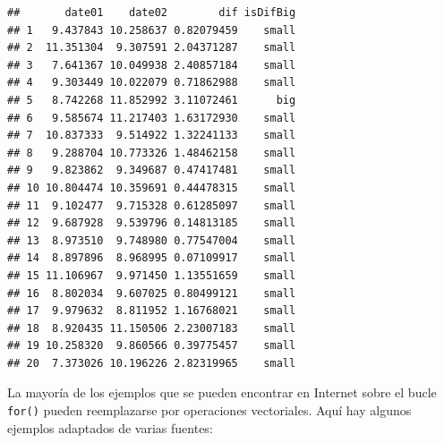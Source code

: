 \documentclass[
]{book}
\newenvironment{Shaded}{\begin{snugshade}}{\end{snugshade}}
\newcommand{\CommentTok}[1]{\textcolor[rgb]{0.56,0.35,0.01}{\textit{#1}}}
\newcommand{\ControlFlowTok}[1]{\textcolor[rgb]{0.13,0.29,0.53}{\textbf{#1}}}
\newcommand{\DataTypeTok}[1]{\textcolor[rgb]{0.13,0.29,0.53}{#1}}
\newcommand{\DecValTok}[1]{\textcolor[rgb]{0.00,0.00,0.81}{#1}}
\newcommand{\KeywordTok}[1]{\textcolor[rgb]{0.13,0.29,0.53}{\textbf{#1}}}
\newcommand{\NormalTok}[1]{#1}
\newcommand{\OperatorTok}[1]{\textcolor[rgb]{0.81,0.36,0.00}{\textbf{#1}}}
\newcommand{\StringTok}[1]{\textcolor[rgb]{0.31,0.60,0.02}{#1}}
\begin{document}
\begin{Shaded}
\end{Shaded}

\begin{verbatim}
##       date01    date02        dif isDifBig
## 1   9.437843 10.258637 0.82079459    small
## 2  11.351304  9.307591 2.04371287    small
## 3   7.641367 10.049938 2.40857184    small
## 4   9.303449 10.022079 0.71862988    small
## 5   8.742268 11.852992 3.11072461      big
## 6   9.585674 11.217403 1.63172930    small
## 7  10.837333  9.514922 1.32241133    small
## 8   9.288704 10.773326 1.48462158    small
## 9   9.823862  9.349687 0.47417481    small
## 10 10.804474 10.359691 0.44478315    small
## 11  9.102477  9.715328 0.61285097    small
## 12  9.687928  9.539796 0.14813185    small
## 13  8.973510  9.748980 0.77547004    small
## 14  8.897896  8.968995 0.07109917    small
## 15 11.106967  9.971450 1.13551659    small
## 16  8.802034  9.607025 0.80499121    small
## 17  9.979632  8.811952 1.16768021    small
## 18  8.920435 11.150506 2.23007183    small
## 19 10.258320  9.860566 0.39775457    small
## 20  7.373026 10.196226 2.82319965    small
\end{verbatim}

La mayoría de los ejemplos que se pueden encontrar en Internet sobre el bucle \texttt{for()} pueden reemplazarse por operaciones vectoriales. Aquí hay algunos ejemplos adaptados de varias fuentes:

\begin{Shaded}
\end{Shaded}
\end{document}
